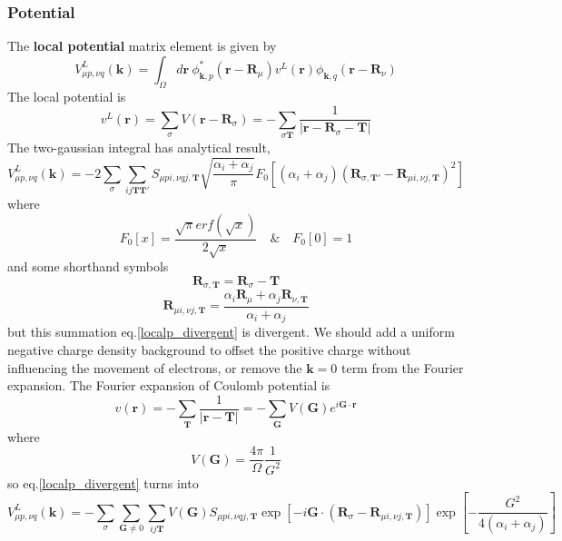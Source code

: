 \documentclass{article}
\begin{document}
        \subsubsection{Potential}
            The \textbf{local potential} matrix element is given by
            \begin{equation}
                V_{\mu p,\nu q}^L(\textbf{k}) = \int_{\Omega}d\textbf{r}\ \phi_{\textbf{k},p}^*(\textbf{r}-\textbf{R}_{\mu})v^L(\textbf{r})\phi_{\textbf{k},q}(\textbf{r}-\textbf{R}_{\nu})
            \end{equation}
            The local potential is
            $$ v^L(\textbf{r}) = \sum_{\sigma}V(\textbf{r}-\textbf{R}_{\sigma}) = -\sum_{\sigma\textbf{T}}\frac{1}{|\textbf{r}-\textbf{R}_{\sigma}-\textbf{T}|} $$
            The two-gaussian integral has analytical result, 
            \begin{equation}
                V_{\mu p,\nu q}^L(\textbf{k}) = -2\sum_{\sigma}\sum_{ij\textbf{T}\textbf{T}'}S_{\mu pi,\nu qj,\textbf{T}}\sqrt{\frac{\alpha_i+\alpha_j}{\pi}}F_0\left[(\alpha_i+\alpha_j)(\textbf{R}_{\sigma,\textbf{T}'}-\textbf{R}_{\mu i,\nu j,\textbf{T}})^2\right]\label{localp_divergent}
            \end{equation}
            where
            $$ F_0\left[x\right] = \frac{\sqrt{\pi}erf(\sqrt{x})}{2\sqrt{x}} \quad \& \quad F_0\left[0\right] = 1 $$
            and some shorthand symbols
            $$ \textbf{R}_{\sigma,\textbf{T}} = \textbf{R}_{\sigma}-\textbf{T} $$
            $$ \textbf{R}_{\mu i,\nu j,\textbf{T}} = \frac{\alpha_i\textbf{R}_{\mu}+\alpha_j\textbf{R}_{\nu,\textbf{T}}}{\alpha_i+\alpha_j} $$
            but this summation eq.\eqref{localp_divergent} is divergent.
            We should add a uniform negative charge density background to offset the positive charge without influencing the movement of electrons,
            or remove the $\textbf{k}=0$ term from the Fourier expansion.
            The Fourier expansion of Coulomb potential is
            \begin{equation}
                v(\textbf{r}) = -\sum_{\textbf{T}}\frac{1}{|\textbf{r}-\textbf{T}|}= -\sum_{\textbf{G}}V(\textbf{G})e^{i\textbf{G}\cdot\textbf{r}}
            \end{equation}
            where
            \begin{equation}
                V(\textbf{G}) = \frac{4\pi}{\Omega}\frac{1}{G^2}
            \end{equation}
            so eq.\eqref{localp_divergent} turns into
            \begin{equation}
                V_{\mu p,\nu q}^L(\textbf{k}) = -\sum_{\sigma}\sum_{\textbf{G}\neq 0}\sum_{ij\textbf{T}}V(\textbf{G})S_{\mu pi,\nu qj,\textbf{T}}
                \exp\left[-i\textbf{G}\cdot(\textbf{R}_{\sigma}-\textbf{R}_{\mu i,\nu j,\textbf{T}})\right]\exp\left[-\frac{G^2}{4(\alpha_i+\alpha_j)}\right]\label{localp_real}
            \end{equation}
\end{document}
